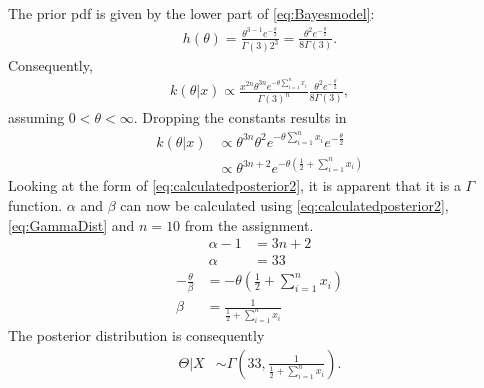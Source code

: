 The prior pdf is given by the lower part of \eqref{eq:Bayesmodel}:
\begin{equation}
\begin{split}
h(\theta) = \frac{\theta^{3-1}e^{-\frac{\theta}{2}}}{\Gamma(3)2^3}
=\frac{\theta^{2}e^{-\frac{\theta}{2}}}{8\Gamma(3)} .
\end{split}
\label{eq:BayesPrior}
\end{equation}
Consequently, 
\begin{equation}
\begin{split}
k(\theta|x) 
\propto \frac{x^{2n}\theta^{3n}e^{-\theta\sum_{i=1}^nx_i}}{\Gamma(3)^n} \frac{\theta^{2}e^{-\frac{\theta}{2}}}{8\Gamma(3)},
\end{split}
\label{eq:calculatedposterior}
\end{equation}
assuming $0<\theta<\infty$. Dropping the constants results in 
\begin{equation}
\begin{split}
k(\theta|x) 
&\propto \theta^{3n}\theta^{2}e^{-\theta\sum_{i=1}^nx_i} e^{-\frac{\theta}{2}}\\
&\propto \theta^{3n+2}e^{-\theta(\frac{1}{2}+\sum_{i=1}^nx_i)}
\end{split}
\label{eq:calculatedposterior2}
\end{equation}
Looking at the form of \eqref{eq:calculatedposterior2}, it is apparent that it is a $\Gamma$ function. $\alpha$ and $\beta$ can now be calculated using \eqref{eq:calculatedposterior2}, \eqref{eq:GammaDist} and $n=10$ from the assignment.
\begin{equation}
\begin{split}
\alpha-1 &= 3n+2\\
\alpha &= 33
\end{split}
\label{eq:postalpha}
\end{equation}
\begin{equation}
\begin{split}
-\frac{\theta}{\beta} &= -\theta\left(\frac{1}{2}+\sum_{i=1}^nx_i\right)\\
\beta &= \frac{1}{\frac{1}{2}+\sum_{i=1}^nx_i}
\end{split}
\label{eq:postbeta}
\end{equation}
The posterior distribution is consequently 
\begin{equation}
\begin{split}
\Theta|X &\sim \Gamma\left(33,\frac{1}{\frac{1}{2}+\sum_{i=1}^nx_i}\right).
\end{split}
\label{eq:Posteriormodel}
\end{equation}

